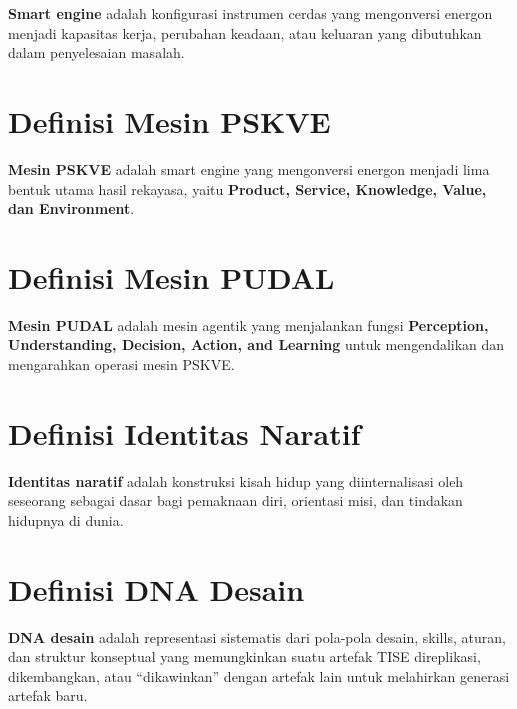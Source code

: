 \documentclass[
  letterpaper,
  DIV=11,
  numbers=noendperiod]{scrreprt}
\begin{document}

\textbf{Smart engine} adalah konfigurasi instrumen cerdas yang
mengonversi energon menjadi kapasitas kerja, perubahan keadaan, atau
keluaran yang dibutuhkan dalam penyelesaian masalah.

\section*{Definisi Mesin PSKVE}\label{definisi-mesin-pskve}


\textbf{Mesin PSKVE} adalah smart engine yang mengonversi energon
menjadi lima bentuk utama hasil rekayasa, yaitu \textbf{Product,
Service, Knowledge, Value, dan Environment}.

\section*{Definisi Mesin PUDAL}\label{definisi-mesin-pudal}


\textbf{Mesin PUDAL} adalah mesin agentik yang menjalankan fungsi
\textbf{Perception, Understanding, Decision, Action, and Learning} untuk
mengendalikan dan mengarahkan operasi mesin PSKVE.

\section*{Definisi Identitas Naratif}\label{definisi-identitas-naratif}


\textbf{Identitas naratif} adalah konstruksi kisah hidup yang
diinternalisasi oleh seseorang sebagai dasar bagi pemaknaan diri,
orientasi misi, dan tindakan hidupnya di dunia.

\section*{Definisi DNA Desain}\label{definisi-dna-desain}


\textbf{DNA desain} adalah representasi sistematis dari pola-pola
desain, skills, aturan, dan struktur konseptual yang memungkinkan suatu
artefak TISE direplikasi, dikembangkan, atau ``dikawinkan'' dengan
artefak lain untuk melahirkan generasi artefak baru.
\end{document}
